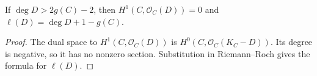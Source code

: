 \begin{corollary}
  \label{mk-cor-large-degree}
  \cite{hartshorne-ag,papaioannou-rr}
  If \(\deg D>2g(C)-2\), then \(H^1(C,\mathcal O_C(D))=0\) and
  \(\ell(D)=\deg D+1-g(C)\).
\end{corollary}

\begin{proof}
  The dual space to \(H^1(C,\mathcal O_C(D))\) is
  \(H^0(C,\mathcal O_C(K_C-D))\).  Its degree is negative, so it has no
  nonzero section.  Substitution in Riemann--Roch gives the formula for
  \(\ell(D)\).
\end{proof}
